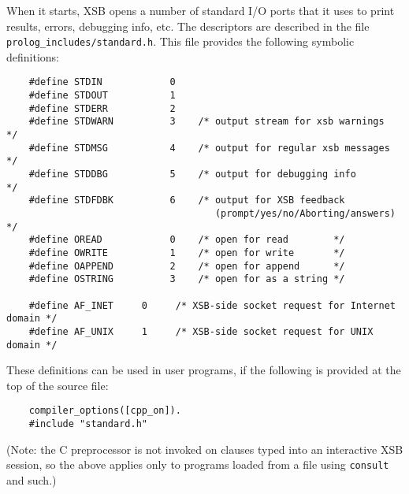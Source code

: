 When it starts, XSB opens a number of standard I/O ports that it uses to
print results, errors, debugging info, etc. The descriptors are described
in the file {\tt prolog\_includes/standard.h}. This file provides the
following symbolic definitions:
\begin{verbatim}
    #define STDIN            0
    #define STDOUT           1
    #define STDERR           2
    #define STDWARN          3    /* output stream for xsb warnings  */
    #define STDMSG           4    /* output for regular xsb messages */
    #define STDDBG           5    /* output for debugging info       */
    #define STDFDBK          6    /* output for XSB feedback
                                     (prompt/yes/no/Aborting/answers) */
    #define OREAD            0    /* open for read        */
    #define OWRITE           1    /* open for write       */
    #define OAPPEND          2    /* open for append      */
    #define OSTRING          3    /* open for as a string */

    #define AF_INET     0     /* XSB-side socket request for Internet domain */
    #define AF_UNIX     1     /* XSB-side socket request for UNIX domain */
\end{verbatim}
These definitions can be used in user programs, if the following is
provided at the top of the source file:
\begin{verbatim}
    compiler_options([cpp_on]).
    #include "standard.h"
\end{verbatim}
(Note: the C preprocessor is not invoked on clauses typed into an
interactive XSB session, so the above applies only to programs loaded from
a file using {\tt consult} and such.)

